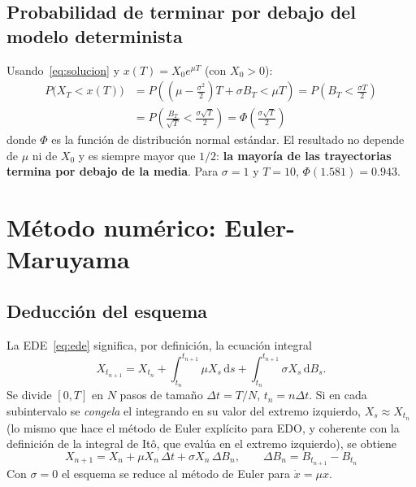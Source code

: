\documentclass[11pt,a4paper]{article}
\newcommand{\dd}{\mathrm{d}}
\begin{document}
\subsection{Probabilidad de terminar por debajo del modelo determinista}

Usando~\eqref{eq:solucion} y $x(T) = X_0e^{\mu T}$ (con $X_0 > 0$):
\begin{align}
    P\big(X_T < x(T)\big)
    &= P\!\left( \left(\mu - \tfrac{\sigma^2}{2}\right)T + \sigma B_T < \mu T \right)
     = P\!\left( B_T < \tfrac{\sigma T}{2} \right) \nonumber\\
    &= P\!\left( \frac{B_T}{\sqrt{T}} < \frac{\sigma\sqrt{T}}{2} \right)
     = \boxed{\Phi\!\left( \frac{\sigma\sqrt{T}}{2} \right)}
    \label{eq:prob}
\end{align}
donde $\Phi$ es la función de distribución normal estándar. El resultado no depende de $\mu$ ni de $X_0$ y es siempre mayor que $1/2$: \textbf{la mayoría de las trayectorias termina por debajo de la media}. Para $\sigma = 1$ y $T = 10$, $\Phi(1.581) = 0.943$.

\section{Método numérico: Euler-Maruyama}
\label{sec:em}

\subsection{Deducción del esquema}

La EDE~\eqref{eq:ede} significa, por definición, la ecuación integral
\begin{equation}
    X_{t_{n+1}} = X_{t_n} + \int_{t_n}^{t_{n+1}} \mu X_s\,\dd s + \int_{t_n}^{t_{n+1}} \sigma X_s\,\dd B_s .
\end{equation}
Se divide $[0,T]$ en $N$ pasos de tamaño $\Delta t = T/N$, $t_n = n\Delta t$. Si en cada subintervalo se \emph{congela} el integrando en su valor del extremo izquierdo, $X_s \approx X_{t_n}$ (lo mismo que hace el método de Euler explícito para EDO, y coherente con la definición de la integral de Itô, que evalúa en el extremo izquierdo), se obtiene
\begin{equation}
    \boxed{X_{n+1} = X_n + \mu X_n\,\Delta t + \sigma X_n\,\Delta B_n,
    \qquad \Delta B_n = B_{t_{n+1}} - B_{t_n}}
    \label{eq:em}
\end{equation}
Con $\sigma = 0$ el esquema se reduce al método de Euler para $\dot x = \mu x$.
\end{document}
